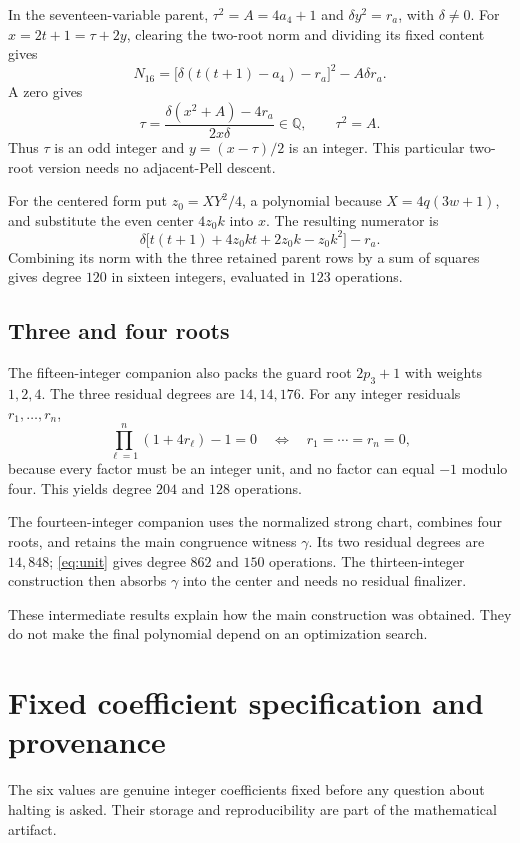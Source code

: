 \documentclass[11pt]{article}
\newcommand{\Q}{\mathbb Q}
\theoremstyle{remark}
\begin{document}
In the seventeen-variable parent, \(\tau^2=A=4a_4+1\) and
\(\delta y^2=r_a\), with \(\delta\ne0\).
For \(x=2t+1=\tau+2y\), clearing the two-root norm and dividing its
fixed content gives
\[
 N_{16}=\bigl[\delta(t(t+1)-a_4)-r_a\bigr]^2-A\delta r_a.
\]
A zero gives
\[
 \tau=\frac{\delta(x^2+A)-4r_a}{2x\delta}\in\Q,\qquad
 \tau^2=A.
\]
Thus \(\tau\) is an odd integer and \(y=(x-\tau)/2\) is an integer.
This particular two-root version needs no adjacent-Pell descent.

For the centered form put \(z_0=XY^2/4\), a polynomial because
\(X=4q(3w+1)\), and substitute the even center \(4z_0k\) into \(x\).
The resulting numerator is
\[
 \delta\bigl[t(t+1)+4z_0kt+2z_0k-z_0k^2\bigr]-r_a.
\]
Combining its norm with the three retained parent rows by a sum of squares
gives degree \(120\) in sixteen integers, evaluated in \(123\) operations.

\subsection{Three and four roots}

The fifteen-integer companion also packs the guard root
\(2p_3+1\) with weights \(1,2,4\).
The three residual degrees are \(14,14,176\).
For any integer residuals \(r_1,\ldots,r_n\),
\[
 \prod_{\ell=1}^n(1+4r_\ell)-1=0
 \quad\Longleftrightarrow\quad r_1=\cdots=r_n=0,             \label{eq:unit}
\]
because every factor must be an integer unit, and no factor can equal
\(-1\) modulo four. This yields degree \(204\) and \(128\) operations.

The fourteen-integer companion uses the normalized strong chart, combines
four roots, and retains the main congruence witness \(\gamma\).
Its two residual degrees are \(14,848\); \eqref{eq:unit} gives degree
\(862\) and \(150\) operations. The thirteen-integer construction then
absorbs \(\gamma\) into the center and needs no residual finalizer.

These intermediate results explain how the main construction was obtained.
They do not make the final polynomial depend on an optimization search.

\section{Fixed coefficient specification and provenance}\label{sec:coeff}

The six values are genuine integer coefficients fixed before any question
about halting is asked.
Their storage and reproducibility are part of the mathematical artifact.
\end{document}
